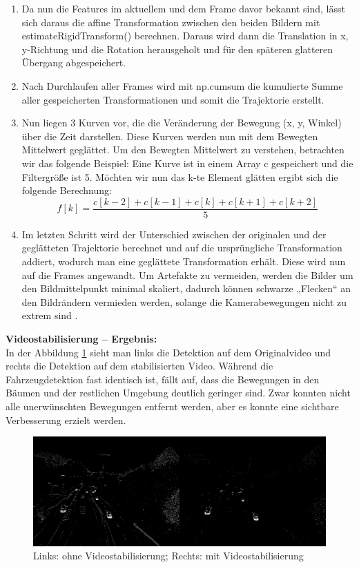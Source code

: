 \documentclass[conference]{IEEEtran}
\begin{document}
\begin{enumerate}
		\item Da nun die Features im aktuellem und dem Frame davor bekannt sind, lässt sich daraus die affine Transformation zwischen den beiden Bildern mit estimateRigidTransform() berechnen. Daraus wird dann die Translation in x, y-Richtung und die Rotation herausgeholt und für den späteren glatteren Übergang abgespeichert.
		
		\item Nach Durchlaufen aller Frames wird mit np.cumsum die kumulierte Summe aller gespeicherten Transformationen und somit die Trajektorie erstellt.
		
		\item Nun liegen 3 Kurven vor, die die Veränderung der Bewegung (x, y, Winkel) über die Zeit darstellen. Diese Kurven werden nun mit dem Bewegten Mittelwert geglättet. Um den Bewegten Mittelwert zu verstehen, betrachten wir das folgende Beispiel: 
		Eine Kurve ist in einem Array c gespeichert und die Filtergröße ist 5. Möchten wir nun das k-te Element glätten ergibt sich die folgende Berechnung:
		\[ f[k] = \frac{c[k-2]+c[k-1]+c[k]+c[k+1]+c[k+2]}{5} \]
		
		\item Im letzten Schritt wird der Unterschied zwischen der originalen und der geglätteten Trajektorie berechnet und auf die ursprüngliche Transformation addiert, wodurch man eine geglättete Transformation erhält. Diese wird nun auf die Frames angewandt. Um Artefakte zu vermeiden, werden die Bilder um den Bildmittelpunkt minimal skaliert, dadurch können schwarze „Flecken“ an den Bildrändern vermieden werden, solange die Kamerabewegungen nicht zu extrem sind \cite{s1}\cite{s2}\cite{s3}\cite{s4}.
		
	\end{enumerate}
	\textbf{Videostabilisierung – Ergebnis:}\\
	In der Abbildung \ref{VS3} sieht man links die Detektion auf dem Originalvideo und rechts die Detektion auf dem stabilisierten Video. Während die Fahrzeugdetektion fast identisch ist, fällt auf, dass die Bewegungen in den Bäumen und der restlichen Umgebung deutlich geringer sind. Zwar konnten nicht alle unerwünschten Bewegungen entfernt werden, aber es konnte eine sichtbare Verbesserung erzielt werden.
	\begin{figure}[!h]
		\begin{center}
			\includegraphics[width=16cm]{Media/VideoStab3E.png}
			\caption{Links: ohne Videostabilisierung; Rechts: mit Videostabilisierung}
			\label{VS3}
		\end{center}
	\end{figure}\\
\end{document}
